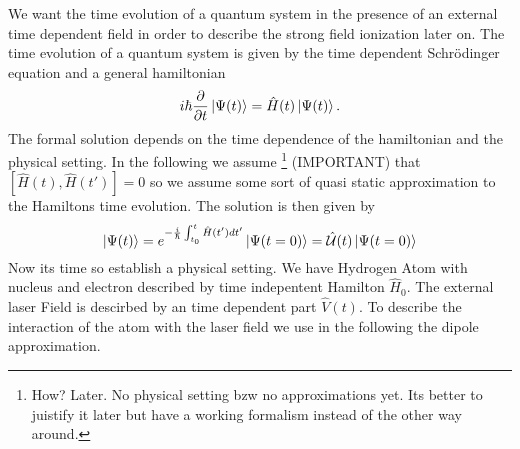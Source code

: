 We want the time evolution of a quantum system in the presence of an external time dependent field in order to describe the strong field ionization later on.
The time evolution of a quantum system is given by the time dependent Schrödinger equation and a general hamiltonian
\begin{equation}
    i \hbar \frac{\partial}{\partial t} \ket{\Psi(t)} = \hat{H}(t) \ket{\Psi(t)}. \label{eq:schroedinger}
\end{equation}
The formal solution depends on the time dependence of the hamiltonian and the physical setting. 
In the following we assume \footnote{How? Later. No physical setting bzw no approximations yet. Its better to juistify it later but have a working formalism instead of the other way around.} (IMPORTANT) that $[\hat{H}(t), \hat{H}(t')] = 0$ so we assume some sort of quasi static approximation to the Hamiltons time evolution. 
The solution is then given by 
\begin{equation}
    \ket{\Psi(t)} = e^{-\frac{i}{\hbar} \int_{t_0}^{t} \hat{H}(t') dt'} \ket{\Psi(t=0)} = \hat{\mathcal{U}}(t)\ket{\Psi(t=0)}
\end{equation}
Now its time so establish a physical setting. We have Hydrogen Atom with nucleus and electron described by time indepentent Hamilton $\hat{H}_0$. 
The external laser Field is descirbed by an time dependent part $\hat{V}(t)$. To describe the interaction of the atom with the laser field we use in the following the dipole approximation.




\newpage
